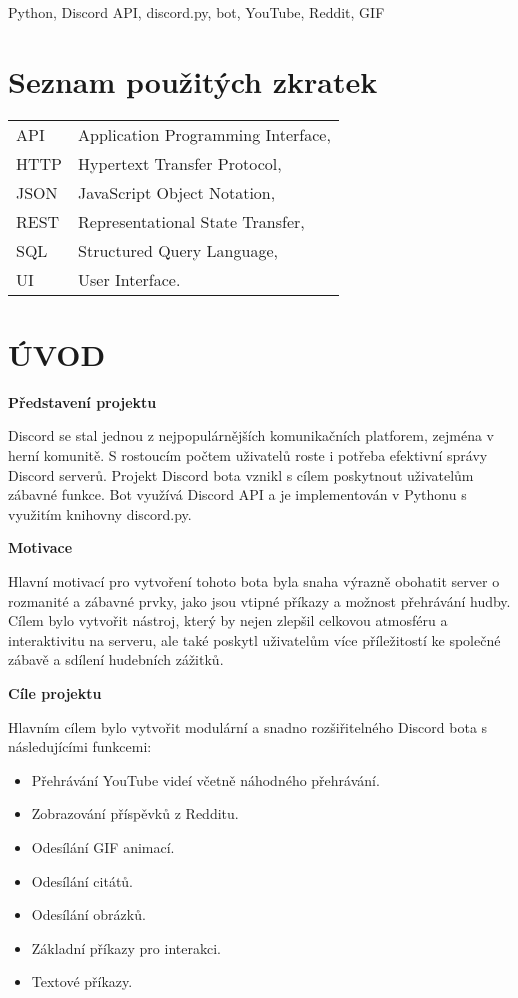 \documentclass[12pt, a4paper]{report}
\begin{document}
	\vspace{18pt}

	\noindent Python, Discord API, discord.py, bot, YouTube, Reddit, GIF

	\chapter*{Seznam použitých zkratek}
	\begin{tabular}{ll}
		API & Application Programming Interface,\\
		HTTP & Hypertext Transfer Protocol,\\
		JSON & JavaScript Object Notation,\\
		REST & Representational State Transfer,\\
		 SQL & Structured Query Language,\\
		UI & User Interface.\\
	\end{tabular}

\newcommand{\introsubheading}[1]{%
  {\noindent\textbf{\normalsize #1}\vspace{1pt}\par}%
}

\chapter*{ÚVOD}

\introsubheading{Představení projektu}
Discord se stal jednou z nejpopulárnějších komunikačních platforem, zejména v herní komunitě. S rostoucím počtem uživatelů roste i potřeba efektivní správy Discord serverů. Projekt Discord bota vznikl s cílem poskytnout uživatelům zábavné funkce. Bot využívá Discord API a je implementován v Pythonu s využitím knihovny discord.py.

\introsubheading{Motivace}

Hlavní motivací pro vytvoření tohoto bota byla snaha výrazně obohatit server o rozmanité a zábavné prvky, jako jsou vtipné příkazy a možnost přehrávání hudby. Cílem bylo vytvořit nástroj, který by nejen zlepšil celkovou atmosféru a interaktivitu na serveru, ale také poskytl uživatelům více příležitostí ke společné zábavě a sdílení hudebních zážitků.

\introsubheading{Cíle projektu}
Hlavním cílem bylo vytvořit modulární a snadno rozšiřitelného Discord bota s následujícími funkcemi:
\begin{itemize}
    \item Přehrávání YouTube videí včetně náhodného přehrávání.
    \item Zobrazování příspěvků z Redditu.
    \item Odesílání GIF animací.
    \item Odesílání citátů.
    \item Odesílání obrázků.
    \item Základní příkazy pro interakci.
    \item Textové příkazy.
\end{itemize}
\end{document}
